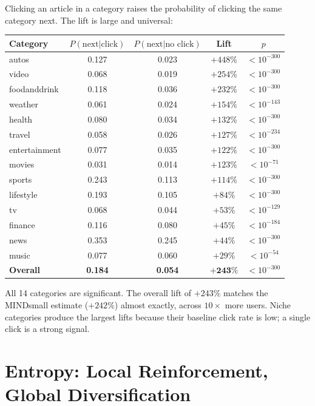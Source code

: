\documentclass[11pt]{article}
\begin{document}
Clicking an article in a category raises the probability of clicking the same category next. The lift is large and universal:

\begin{center}
\begin{tabular}{lcccc}
\toprule
Category & $P(\text{next}|\text{click})$ & $P(\text{next}|\text{no click})$ & Lift & $p$ \\
\midrule
autos & 0.127 & 0.023 & $+448\%$ & $< 10^{-300}$ \\
video & 0.068 & 0.019 & $+254\%$ & $< 10^{-300}$ \\
foodanddrink & 0.118 & 0.036 & $+232\%$ & $< 10^{-300}$ \\
weather & 0.061 & 0.024 & $+154\%$ & $< 10^{-143}$ \\
health & 0.080 & 0.034 & $+132\%$ & $< 10^{-300}$ \\
travel & 0.058 & 0.026 & $+127\%$ & $< 10^{-234}$ \\
entertainment & 0.077 & 0.035 & $+122\%$ & $< 10^{-300}$ \\
movies & 0.031 & 0.014 & $+123\%$ & $< 10^{-71}$ \\
sports & 0.243 & 0.113 & $+114\%$ & $< 10^{-300}$ \\
lifestyle & 0.193 & 0.105 & $+84\%$ & $< 10^{-300}$ \\
tv & 0.068 & 0.044 & $+53\%$ & $< 10^{-129}$ \\
finance & 0.116 & 0.080 & $+45\%$ & $< 10^{-184}$ \\
news & 0.353 & 0.245 & $+44\%$ & $< 10^{-300}$ \\
music & 0.077 & 0.060 & $+29\%$ & $< 10^{-54}$ \\
\midrule
\textbf{Overall} & \textbf{0.184} & \textbf{0.054} & $\boldsymbol{+243\%}$ & $< 10^{-300}$ \\
\bottomrule
\end{tabular}
\end{center}

All 14 categories are significant. The overall lift of $+243\%$ matches the MINDsmall estimate ($+242\%$) almost exactly, across $10\times$ more users. Niche categories produce the largest lifts because their baseline click rate is low; a single click is a strong signal.

\section{Entropy: Local Reinforcement, Global Diversification}
\end{document}
